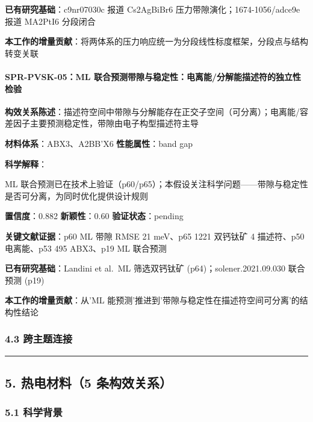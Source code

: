 \documentclass[12pt,a4paper]{ctexart}
\begin{document}
\textbf{已有研究基础}：c9nr07030c 报道 Cs2AgBiBr6 压力带隙演化；1674-1056/adce9e 报道 MA2PtI6 分段闭合

\textbf{本工作的增量贡献}：将两体系的压力响应统一为分段线性标度框架，分段点与结构转变关联

\paragraph{SPR-PVSK-05：ML 联合预测带隙与稳定性：电离能/分解能描述符的独立性检验}\label{spr-pvsk-05ml-ux8054ux5408ux9884ux6d4bux5e26ux9699ux4e0eux7a33ux5b9aux6027ux7535ux79bbux80fdux5206ux89e3ux80fdux63cfux8ff0ux7b26ux7684ux72ecux7acbux6027ux68c0ux9a8c}

\textbf{构效关系陈述}：描述符空间中带隙与分解能存在正交子空间（可分离）；电离能/容差因子主要预测稳定性，带隙由电子构型描述符主导

\textbf{材料体系}：ABX3、A2BB'X6 \textbar{} \textbf{性能属性}：band gap

\textbf{科学解释}：

ML 联合预测已在技术上验证（p60/p65）；本假设关注科学问题------带隙与稳定性是否可分离，为同时优化提供设计规则

\textbf{置信度}：0.882 \textbar{} \textbf{新颖性}：0.60 \textbar{} \textbf{验证状态}：pending

\textbf{关键文献证据}：p60 ML 带隙 RMSE 21 meV、p65 1221 双钙钛矿 4 描述符、p50 电离能、p53 495 ABX3、p19 ML 联合预测

\textbf{已有研究基础}：Landini et al.~ML 筛选双钙钛矿 (p64)；solener.2021.09.030 联合预测 (p19)

\textbf{本工作的增量贡献}：从'ML 能预测'推进到'带隙与稳定性在描述符空间可分离'的结构性结论

\subsubsection{4.3 跨主题连接}\label{ux8de8ux4e3bux9898ux8fdeux63a5-1}

\begin{center}\rule{0.5\linewidth}{0.5pt}\end{center}

\subsection{5. 热电材料（5 条构效关系）}\label{ux70edux7535ux6750ux65995-ux6761ux6784ux6548ux5173ux7cfb}

\subsubsection{5.1 科学背景}\label{ux79d1ux5b66ux80ccux666f-3}
\end{document}
